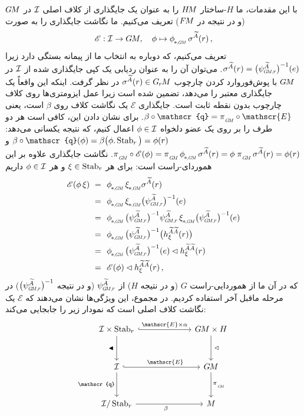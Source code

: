 با این مقدمات، ما $H$-ساختار $H\mkern-2.5muM$ را به عنوان یک جایگذاری از کلاف اصلی $\mathcal{I}$ در $G\mkern-1.4muM$ (و در نتیجه در $F\mkern-1.5muM$) تعریف می‌کنیم.
ما نگاشت جایگذاری را به صورت
\begin{align}
	\mathscr{E}: \I \to \GM,\ \ \ \phi \mapsto \dphiGM\, \sigma^{\widetilde{A}}(r) \,,
\end{align}
تعریف می‌کنیم، که دوباره به انتخاب ما از پیمانه بستگی دارد زیرا $\sigma^{\widetilde{A}}(r) = \big(\psiGMr^{\widetilde{A}}\big)^{-1}(e)$.
می‌توان آن را به عنوان ردیابی یک کپی جایگذاری شده از $\mathcal{I}$ در $G\mkern-1.4muM$ با پوش‌فوروارد کردن چارچوب $\sigma^{\widetilde{A}}(r) \in G_{\mkern-1.3mu r}\mkern-1.3muM$ در نظر گرفت.
اینکه این واقعاً یک جایگذاری معتبر را می‌دهد، تضمین شده است زیرا عمل ایزومتری‌ها روی کلاف چارچوب بدون نقطه ثابت است.
جایگذاری $\mathscr{E}$ یک نگاشت کلاف روی $\beta$ است، یعنی $\beta\circ\mathscr{q} = \piGM \circ \mathscr{E}$.
برای نشان دادن این، کافی است هر دو طرف را بر روی یک عضو دلخواه $\phi\in\mathcal{I}$ اعمال کنیم، که نتیجه یکسانی می‌دهد:
$\beta \circ \mathscr{q} (\phi) = \beta\big( \phi.\Stab{r} \big) = \phi(r)$ و
$\piGM \circ \mathscr{E} (\phi) = \piGM\, \dphiGM\, \sigma^{\widetilde{A}}(r) = \phi\; \piGM\, \sigma^{\widetilde{A}}(r) = \phi(r)$.
نگاشت جایگذاری علاوه بر این هموردای-راست است:
برای هر $\xi \in \operatorname{Stab}_{r}$ و هر $\phi \in \mathcal{I}$ داریم
\begin{align}
	\mathscr{E}(\phi\,\xi)
	\ =&\ \ \dphiGM\, \dxiGM \sigma^{\widetilde{A}}(r) \notag \\
	\ =&\ \ \dphiGM\, \dxiGM \big(\psiGMr^{\widetilde{A}}\big)^{-1}(e) \notag \\
	\ =&\ \ \dphiGM\, \big(\psiGMr^{\widetilde{A}}\big)^{-1} \psiGMr^{\widetilde{A}}\, \dxiGM \big(\psiGMr^{\widetilde{A}}\big)^{-1}(e) \notag \\
	\ =&\ \ \dphiGM\, \big(\psiGMr^{\widetilde{A}}\big)^{-1} \big( h_\xi^{\widetilde{A}\widetilde{A}}(r) \big) \notag \\
	\ =&\ \ \dphiGM\, \big(\psiGMr^{\widetilde{A}}\big)^{-1}(e) \lhd h_\xi^{\widetilde{A}\widetilde{A}}(r) \notag \\
	\ =&\ \ \mathscr{E}(\phi) \lhd h_\xi^{\widetilde{A}\widetilde{A}}(r) \,,
\end{align}
که در آن ما از هموردایی-راست $G$ (و در نتیجه $H$) از $\psiGMr^{\widetilde{A}}$ (و در نتیجه $\big(\psiGMr^{\widetilde{A}}\big)^{-1}$) در مرحله ماقبل آخر استفاده کردیم.
در مجموع، این ویژگی‌ها نشان می‌دهند که $\mathscr{E}$ یک نگاشت کلاف اصلی است که نمودار زیر را جابجایی می‌کند:
\begin{equation}\label{cd:GM_def_embedding}
	\begin{tikzcd}[row sep=3.em, column sep=6.5em]
		\I \times \Stab{r}
		\arrow[r, "\mathscr{E}\times\alpha", hook]
		\arrow[d, "\blacktriangleleft\,"']
		& \GM \times H
		\arrow[d, "\,\lhd"]
		\\
		\I
		\arrow[r, pos=.55, "\mathscr{E}", hook]
		\arrow[d, "\mathscr{q}"']
		& \GM
		\arrow[d, "\piGM"]
		\\
		\I/\Stab{r}
		\arrow[r, pos=.45, "\beta"']
		& M
	\end{tikzcd}
\end{equation}
